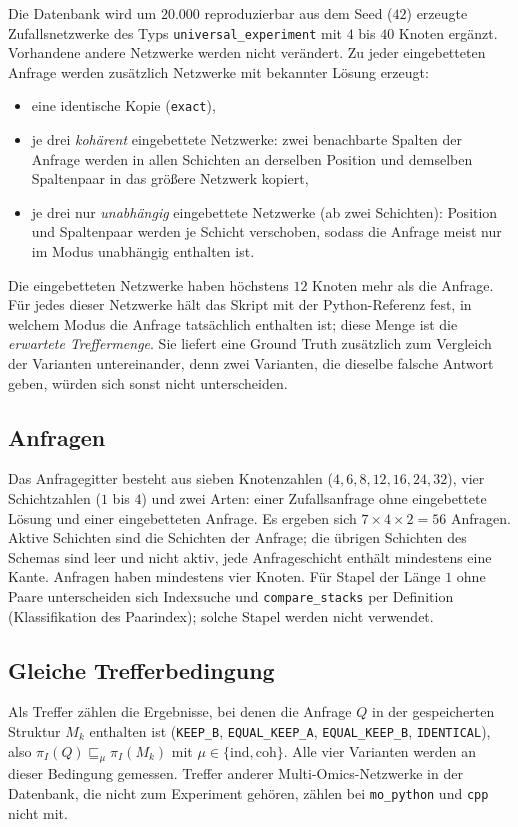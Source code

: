 \documentclass[a4paper,12pt, twoside]{report}
\theoremstyle{definition}
\begin{document}
Die Datenbank wird um $20.000$ reproduzierbar aus dem Seed ($42$) erzeugte Zufallsnetzwerke des Typs \texttt{universal\_experiment} mit $4$ bis $40$ Knoten ergänzt. Vorhandene andere Netzwerke werden nicht verändert. Zu jeder eingebetteten Anfrage werden zusätzlich Netzwerke mit bekannter Lösung erzeugt:
\begin{itemize}
	\item eine identische Kopie (\texttt{exact}),
	\item je drei \emph{kohärent} eingebettete Netzwerke: zwei benachbarte Spalten der Anfrage werden in allen Schichten an derselben Position und demselben Spaltenpaar in das größere Netzwerk kopiert,
	\item je drei nur \emph{unabhängig} eingebettete Netzwerke (ab zwei Schichten): Position und Spaltenpaar werden je Schicht verschoben, sodass die Anfrage meist nur im Modus unabhängig enthalten ist.
\end{itemize}
Die eingebetteten Netzwerke haben höchstens $12$ Knoten mehr als die Anfrage. Für jedes dieser Netzwerke hält das Skript mit der Python-Referenz fest, in welchem Modus die Anfrage tatsächlich enthalten ist; diese Menge ist die \emph{erwartete Treffermenge}. Sie liefert eine Ground Truth zusätzlich zum Vergleich der Varianten untereinander, denn zwei Varianten, die dieselbe falsche Antwort geben, würden sich sonst nicht unterscheiden.

\subsection{Anfragen}

Das Anfragegitter besteht aus sieben Knotenzahlen ($4,6,8,12,16,24,32$), vier Schichtzahlen ($1$ bis $4$) und zwei Arten: einer Zufallsanfrage ohne eingebettete Lösung und einer eingebetteten Anfrage. Es ergeben sich $7\times4\times2=56$ Anfragen. Aktive Schichten sind die Schichten der Anfrage; die übrigen Schichten des Schemas sind leer und nicht aktiv, jede Anfrageschicht enthält mindestens eine Kante. Anfragen haben mindestens vier Knoten. Für Stapel der Länge $1$ ohne Paare unterscheiden sich Indexsuche und \texttt{compare\_stacks} per Definition (Klassifikation des Paarindex); solche Stapel werden nicht verwendet.

\subsection{Gleiche Trefferbedingung}

Als Treffer zählen die Ergebnisse, bei denen die Anfrage $Q$ in der gespeicherten Struktur $M_k$ enthalten ist (\texttt{KEEP\_B}, \texttt{EQUAL\_KEEP\_A}, \texttt{EQUAL\_KEEP\_B}, \texttt{IDENTICAL}), also $\pi_I(Q)\sqsubseteq_\mu\pi_I(M_k)$ mit $\mu\in\{\mathrm{ind},\mathrm{coh}\}$. Alle vier Varianten werden an dieser Bedingung gemessen. Treffer anderer Multi-Omics-Netzwerke in der Datenbank, die nicht zum Experiment gehören, zählen bei \texttt{mo\_python} und \texttt{cpp} nicht mit.
\end{document}
